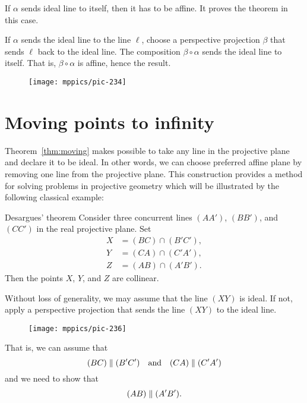 If $\alpha$ sends ideal line to itself,
then it has to be affine. 
It proves the theorem in this case.

If $\alpha$ sends the ideal line to the line $\ell$, choose a perspective projection $\beta$ that sends $\ell$ back to the ideal line.
The composition $\beta\circ\alpha$ sends the ideal line to itself.
That is, $\beta\circ\alpha$ is affine, hence the result.
\qeds

{

\begin{wrapfigure}{r}{40mm}
\vskip6mm
\centering
\texttt{[image: mppics/pic-234]}
\end{wrapfigure}

\section*{Moving points to infinity}


Theorem~\ref{thm:moving} makes possible to take any line in the projective plane and declare it to be ideal.
In other words, we can choose preferred affine plane by removing one line from the projective plane.
This construction provides a method for solving problems in projective geometry 
which will be illustrated by the following classical example:


\begin{thm}{Desargues' theorem}\label{thm:desargues}
Consider three concurrent lines $(AA')$, $(BB')$, and $(CC')$ in the real projective plane.
Set
\begin{align*}
X&=(BC)\cap (B'C'),\\
Y&=(CA)\cap (C'A'),\\
Z&=(AB)\cap (A'B').
\end{align*}
Then the points $X$, $Y$, and $Z$ are collinear.
\end{thm}

}

Without loss of generality, we may assume that the line $(XY)$ is ideal.
If not, apply a perspective projection that sends the line $(XY)$ to the ideal line.

\begin{wrapfigure}{o}{40mm}
\vskip-8mm
\centering
\texttt{[image: mppics/pic-236]}
\end{wrapfigure}

That is, we can assume that 
\[(BC)\z\parallel (B'C')\quad\text{and}\quad(CA)\z\parallel (C'A')\]
and we need to show that 
\[(AB)\z\parallel(A'B').\]

